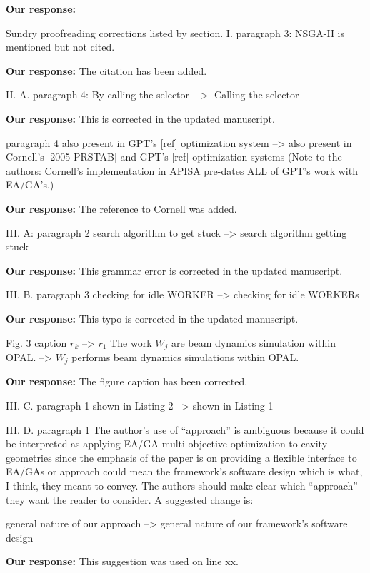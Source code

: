 \documentclass{article}
\begin{document}
{\bf Our response:} {\color{blue} }




Sundry proofreading corrections listed by section.
I. paragraph 3: NSGA-II is mentioned but not cited.

{\bf Our response:} {\color{blue} The citation has been added.}


II. A. paragraph 4: By calling the selector --$>$ Calling the selector

{\bf Our response:} {\color{blue} This is corrected in the updated manuscript.}

paragraph 4
also present in GPT's [ref] optimization system --> also
present in Cornell's [2005 PRSTAB] and GPT's [ref] optimization systems
(Note to the authors: Cornell's implementation in APISA pre-dates ALL
of GPT's work with EA/GA's.)

{\bf Our response:} {\color{blue} The reference to Cornell was added.}

III. A: paragraph 2
search algorithm to get stuck --> search algorithm getting
stuck

{\bf Our response:} {\color{blue} This grammar error is corrected in the updated manuscript.}

III. B. paragraph 3
checking for idle WORKER --> checking for idle WORKERs

{\bf Our response:} {\color{blue} This typo is corrected in the updated manuscript.}

Fig. 3 caption
$r_k$ --> $r_1$
The work $W_j$ are beam dynamics simulation within OPAL.
--> $W_j$ performs beam dynamics simulations within OPAL.

{\bf Our response:} {\color{blue} The figure caption has been corrected.}

III. C. paragraph 1
shown in Listing 2 --> shown in Listing 1

III. D. paragraph 1
The author's use of ``approach'' is ambiguous because it could be
interpreted as applying EA/GA multi-objective optimization to cavity
geometries since the emphasis of the paper is on providing a flexible
interface to EA/GAs or approach could mean the framework's software
design which is what, I think, they meant to convey. The authors
should make clear which ``approach'' they want the reader to consider.
A suggested change is:

general nature of our approach --> general nature of our
framework's software design

{\bf Our response:} {\color{blue} This suggestion was used on line xx.}
\end{document}
